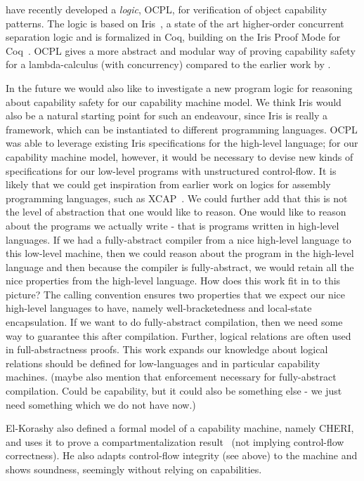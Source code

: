 \documentclass[format=acmsmall, review=false, screen=true]{acmart}
\newenvironment{toplas}
    {\color{OliveGreen}
          
    }{}
\newcommand{\itoplassug}[1]
    {{\color{Blue} #1}}
\begin{document}
\citet{swasey:2017} have recently developed a \emph{logic}, OCPL, for verification
of object capability patterns. The logic is based on
Iris~\citep{iris,iris2,iris3}, a state of the art higher-order concurrent
separation logic and is formalized in Coq, building on the Iris Proof Mode for
Coq~\citep{ipm}. OCPL gives a more abstract and modular way of proving
capability safety for a lambda-calculus (with concurrency) compared to the
earlier work by \citet{Devriese:2016ObjCap}.
\begin{toplas}
In the future we would also like to
investigate a new program logic for reasoning about capability safety for our
capability machine model. We think Iris would also be a natural starting point
for such an endeavour, since Iris is really a framework, which can be
instantiated to different programming languages. OCPL was able to leverage
existing Iris specifications for the high-level language; for our capability
machine model, however, it would be necessary to devise new kinds of
specifications for our low-level programs with unstructured control-flow. It is
likely that we could get inspiration from earlier work on logics for assembly
programming languages, such as XCAP~\citep{xcap}.
\end{toplas}
\itoplassug{We could further add that this is not the level of abstraction that one would like to reason. One would like to reason about the programs we actually write - that is programs written in high-level languages. If we had a fully-abstract compiler from a nice high-level language to this low-level machine, then we could reason about the program in the high-level language and then because the compiler is fully-abstract, we would retain all the nice properties from the high-level language. How does this work fit in to this picture? The calling convention ensures two properties that we expect our nice high-level languages to have, namely well-bracketedness and local-state encapsulation. If we want to do fully-abstract compilation, then we need some way to guarantee this after compilation. Further, logical relations are often used in full-abstractness proofs. This work expands our knowledge about logical relations should be defined for low-languages and in particular capability machines. (maybe also mention that enforcement necessary for fully-abstract compilation. Could be capability, but it could also be something else - we just need something which we do not have now.)  }

El-Korashy also defined a formal model of a capability machine, namely CHERI,
and uses it to prove a compartmentalization
result~\citep{akram_el-korashy_formal_2016} (not implying control-flow
correctness). He also adapts control-flow integrity (see above) to the machine
and shows soundness, seemingly without relying on capabilities.
\end{document}
